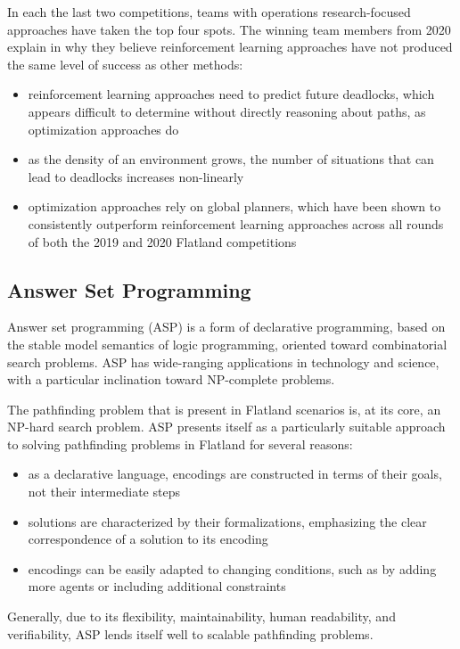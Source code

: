 \documentclass[11pt]{article}
\begin{document}
In each the last two competitions, teams with operations research-focused approaches have taken the top four spots.  The winning team members from 2020 explain in \citep{lichzhchhastmako21a} why they believe reinforcement learning approaches have not produced the same level of success as other methods:
\begin{itemize}
	\item reinforcement learning approaches need to predict future deadlocks, which appears difficult to determine without directly reasoning about paths, as optimization approaches do
	\item as the density of an environment grows, the number of situations that can lead to deadlocks increases non-linearly
	\item optimization approaches rely on global planners, which have been shown to consistently outperform reinforcement learning approaches across all rounds of both the 2019 and 2020 Flatland competitions
\end{itemize}


\subsection{Answer Set Programming}
Answer set programming (ASP) \citep{lifschitz19a} is a form of declarative programming, based on the stable model semantics of logic programming, oriented toward combinatorial search problems.  ASP has wide-ranging applications in technology and science, with a particular inclination toward NP-complete problems.


The pathfinding problem that is present in Flatland scenarios is, at its core, an NP-hard search problem.  ASP presents itself as a particularly suitable approach to solving pathfinding problems in Flatland for several reasons:
\begin{itemize}
	\item as a declarative language, encodings are constructed in terms of their goals, not their intermediate steps
	\item solutions are characterized by their formalizations, emphasizing the clear correspondence of a solution to its encoding
	\item encodings can be easily adapted to changing conditions, such as by adding more agents or including additional constraints
\end{itemize}

\noindent Generally, due to its flexibility, maintainability, human readability, and verifiability, ASP lends itself well to scalable pathfinding problems. \medskip
\end{document}
